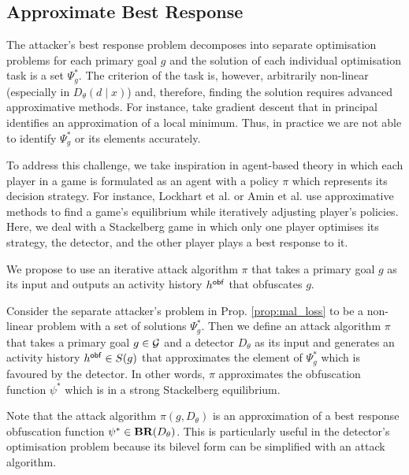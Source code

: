 \subsection{Approximate Best Response}
The attacker's best response problem decomposes into separate optimisation problems for each primary goal $g$ and the solution of each individual optimisation task is a set $\Psi^*_g$. The criterion of the task is, however, arbitrarily non-linear (especially in $D_\theta(d \mid x)$) and, therefore, finding the solution requires advanced approximative methods. For instance, take gradient descent that in principal identifies an approximation of a local minimum. Thus, in practice we are not able to identify $\Psi^*_g$ or its elements accurately.

To address this challenge, we take inspiration in agent-based theory in which each player in a game is formulated as an agent with a policy $\pi$ which represents its decision strategy. For instance, Lockhart et al. \cite{exploitability_descent} or Amin et al. \cite{stackgrad} use approximative methods to find a game's equilibrium while iteratively adjusting player's policies. Here, we deal with a Stackelberg game in which only one player optimises its strategy, the detector, and the other player plays a best response to it.

We propose to use an iterative attack algorithm $\pi$ that takes a primary goal $g$ as its input and outputs an activity history $h^{\mathsf{obf}}$ that obfuscates $g$.

\begin{definition}\label{def:response_algorithm}

    Consider the separate attacker's problem in Prop. \ref{prop:mal_loss} to be a non-linear problem with a set of solutions $\Psi^*_g$. Then we define an attack algorithm $\pi$ that takes a primary goal $g \in \mathcal{G}$ and a detector $D_\theta$ as its input and generates an activity history $h^{\mathsf{obf}} \in S(g)$ that approximates the element of $\Psi^*_g$ which is favoured by the detector. In other words, $\pi$ approximates the obfuscation function $\psi^*$ which is in a strong Stackelberg equilibrium.

\end{definition}

Note that the attack algorithm $\pi(g, D_\theta)$ is an approximation of a best response obfuscation function $\psi^* \in \textbf{BR}(D_\theta)$. This is particularly useful in the detector's optimisation problem because its bilevel form can be simplified with an attack algorithm.

